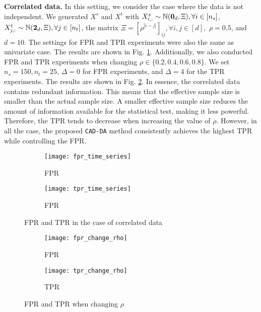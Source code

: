 \textbf{Correlated data.} In this setting, we consider the case where the data is not independent.
%
We generated $X^s$ and $X^t$ with $X^s_{i, :} \sim \mathbb{N}(\bm 0_d, \Xi), \forall i \in [n_s]$, $X^t_{j, :} \sim \mathbb{N}(\bm 2_d, \Xi), \forall j \in [n_t]$, the matrix %
%
$
\Xi = \left [\rho^{|i - j|} \right ]_{ij}, \forall i,j \in [d],
$
$\rho = 0.5$, and $d = 10$.
%
The settings for FPR and TPR experiments were also the same as univariate case.
%
The results are shown in Fig. \ref{fig:fpr_tpr_correlated}.
%
Additionally, we also conducted FPR and TPR experiments when changing $\rho \in \{ 0.2, 0.4, 0.6, 0.8\}$. We set $n_s = 150, n_t = 25$, $\Delta = 0$ for FPR experiments, and $\Delta = 4$ for the TPR experiments.
%
The results are shown in Fig. \ref{fig:fpr_tpr_correlated_change_rho}.
%
In essence,  the correlated data contains redundant information. 
%
This means that the effective sample size is smaller than the actual sample size. 
%
A smaller effective sample size reduces the amount of information available for the statistical test, making it less powerful. 
%
Therefore, the TPR tends to decrease when increasing the value of $\rho$.
%
However, in all the case, the proposed {\tt CAD-DA} method consistently achieves the highest TPR while controlling the FPR.

\begin{figure}[!t]
     \centering
     \begin{subfigure}[b]{0.492\linewidth}
         \centering
         \texttt{[image: fpr\_time\_series]}
         \caption{FPR}
     \end{subfigure}
     \hfill
     \begin{subfigure}[b]{0.492\linewidth}
         \centering
         \texttt{[image: tpr\_time\_series]}
         \caption{FPR}
     \end{subfigure}
     \caption{FPR and TPR in the case of correlated data}
     \label{fig:fpr_tpr_correlated}
\end{figure}

\begin{figure}[!t]
     \centering
     \begin{subfigure}[b]{0.492\linewidth}
         \centering
         \texttt{[image: fpr\_change\_rho]}
         \caption{FPR}
     \end{subfigure}
     \hfill
     \begin{subfigure}[b]{0.492\linewidth}
         \centering
         \texttt{[image: tpr\_change\_rho]}
         \caption{TPR}
     \end{subfigure}
     \caption{FPR and TPR when changing  $\rho$}
     \label{fig:fpr_tpr_correlated_change_rho}
\end{figure}


